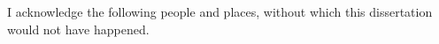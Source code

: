 \begin{acknowledgements}

I acknowledge the following people and places, without which this
dissertation would not have happened.

\end{acknowledgements}
